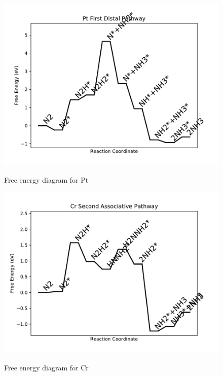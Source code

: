 \documentclass[journal=jacsat,manuscript=article]{achemso}
\begin{document}
\begin{figure}
\includegraphics[width=1\linewidth]{data/plots/Pt_distal_1.pdf}
\label{fig:Pt_distal_1}
\caption{Free energy diagram for Pt}
\end{figure}

\newpage
\begin{figure}
\includegraphics[width=1\linewidth]{data/plots/Cr_associative_2.pdf}
\label{fig:Cr_associative_2}
\caption{Free energy diagram for Cr}
\end{figure}
\end{document}
